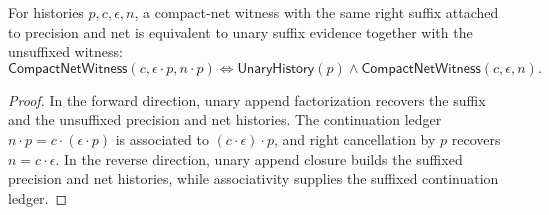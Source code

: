 \begin{theorem}
\label{thm:compact-net-witness-suffix-iff}
For histories $p,c,\epsilon,n$, a compact-net witness with the same right
suffix attached to precision and net is equivalent to unary suffix evidence
together with the unsuffixed witness:
$$
\mathsf{CompactNetWitness}(c,\epsilon\cdot p,n\cdot p)
\Longleftrightarrow
\mathsf{UnaryHistory}(p)\wedge
\mathsf{CompactNetWitness}(c,\epsilon,n).
$$
\end{theorem}
\begin{proof}
In the forward direction, unary append factorization recovers the suffix and
the unsuffixed precision and net histories. The continuation ledger
$n\cdot p=c\cdot(\epsilon\cdot p)$ is associated to
$(c\cdot\epsilon)\cdot p$, and right cancellation by $p$ recovers
$n=c\cdot\epsilon$. In the reverse direction, unary append closure builds the
suffixed precision and net histories, while associativity supplies the
suffixed continuation ledger.
\end{proof}

